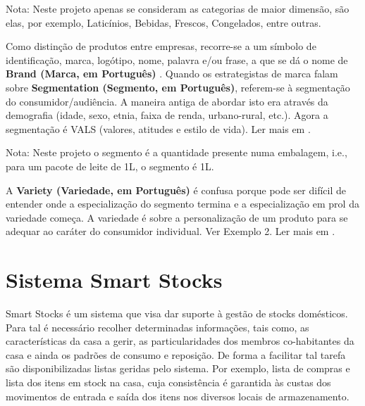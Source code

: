 {\footnotesize Nota: Neste projeto apenas se consideram as categorias de maior dimensão, são elas, por exemplo, Laticínios, Bebidas, Frescos, Congelados, entre outras.}

Como distinção de produtos entre empresas, recorre-se a um símbolo de identificação, marca, logótipo, nome, palavra e/ou frase, a que se dá o nome de \textbf{Brand (Marca, em Português)} \cite{investopedia:brandDefinition2018}.
Quando os estrategistas de marca falam sobre \textbf{Segmentation (Segmento, em Português)}, referem-se à segmentação do consumidor/audiência. A maneira antiga de abordar isto era através da demografia (idade, sexo, etnia, faixa de renda, urbano-rural, etc.). Agora a segmentação é VALS (valores, atitudes e estilo de vida). Ler mais em \cite{sphereoi:itemIdentification2018}.

{\footnotesize Nota: Neste projeto o segmento é a quantidade presente numa embalagem, i.e., para um pacote de leite de 1L, o segmento é 1L.}

A \textbf{Variety (Variedade, em Português)} é confusa porque pode ser difícil de entender onde a especialização do segmento termina e a especialização em prol da variedade começa. A variedade é sobre a personalização de um produto para se adequar ao caráter do consumidor individual. Ver Exemplo 2. Ler mais em \cite{sphereoi:itemIdentification2018}.\\[0.25cm]

\noindent{}


%
%
\section{Sistema Smart Stocks} \label{sec22}
Smart Stocks é um sistema que visa dar suporte à gestão de stocks domésticos. Para tal é necessário recolher determinadas informações, tais como, as características da casa a gerir, as particularidades dos membros co-habitantes da casa e ainda os padrões de consumo e reposição. De forma a facilitar tal tarefa são disponibilizadas listas geridas pelo sistema. Por exemplo, lista de compras e lista dos itens em stock na casa, cuja consistência é garantida às custas dos movimentos de entrada e saída dos itens nos diversos locais de armazenamento.

